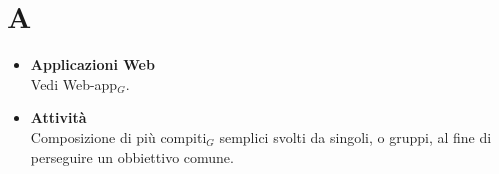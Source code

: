 \chapter{A} \label{A}
\begin{itemize}
		\item \textbf{Applicazioni Web}\\
		Vedi Web-app$_G$.
		\item \textbf{Attività}\\
		Composizione di più compiti$_G$ semplici svolti da singoli, o gruppi, al fine di perseguire un obbiettivo comune.

	\end{itemize}
